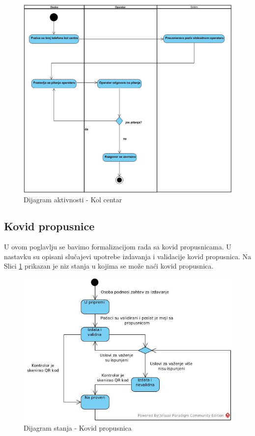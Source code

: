 \documentclass[titlepage]{article}
\begin{document}
\begin{figure}[H]
\includegraphics[width=\textwidth,height=\textheight,keepaspectratio]{Kol_centar}
\caption{Dijagram aktivnosti - Kol centar}
\end{figure}

\subsection{Kovid propusnice}

U ovom poglavlju se bavimo formalizacijom rada sa kovid propusnicama. U nastavku su opisani slučajevi upotrebe izdavanja i validacije kovid propusnica. Na Slici \ref{slk:propusnica} prikazan je niz stanja u kojima se može naći kovid propusnica.

\begin{figure}[H]
\centering
\includegraphics[scale=0.6]{Kovid_propusnica}
\caption{Dijagram stanja - Kovid propusnica}
\label{slk:propusnica}
\end{figure}
\end{document}

